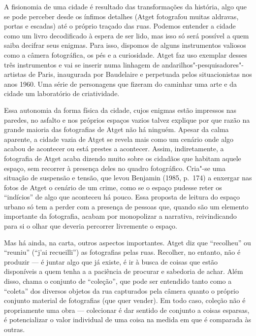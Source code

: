A fisionomia de uma cidade é resultado das transformações da história,
algo que se pode perceber desde os ínfimos detalhes (Atget fotografou
muitas aldravas, portas e escadas) até o próprio traçado das ruas.
Podemos entender a cidade como um livro decodificado à espera de ser
lido, mas isso só será possível a quem saiba decifrar seus enigmas. Para
isso, dispomos de alguns instrumentos valiosos como a câmera
fotográfica, os pés e a curiosidade. Atget faz uso exemplar desses três
instrumentos e vai se inserir numa linhagem de
andarilhos"-pesquisadores"-artistas de Paris, inaugurada por Baudelaire e
perpetuada pelos situacionistas nos anos 1960. Uma série de personagens
que fizeram do caminhar uma arte e da cidade um laboratório de
criatividade.

Essa autonomia da forma física da cidade, cujos enigmas estão impressos
nas paredes, no asfalto e nos próprios espaços vazios talvez explique
por que razão na grande maioria das fotografias de Atget não há ninguém. Apesar
da calma aparente, a cidade vazia de Atget se revela mais como um
cenário onde algo acabou de acontecer ou está prestes a acontecer.
Assim, indiretamente, a fotografia de Atget acaba dizendo muito sobre os
cidadãos que habitam aquele espaço, sem recorrer à presença deles no
quadro fotográfico. Cria"-se uma situação de suspensão e tensão, que
levou Benjamin (1985, p.~174) a enxergar nas fotos de Atget o cenário de
um crime, como se o espaço pudesse reter os ``indícios'' de algo que
aconteceu há pouco. Essa proposta de leitura do espaço urbano só tem a
perder com a presença de pessoas que, quando são um elemento importante
da fotografia, acabam por monopolizar a narrativa, reivindicando para si
o olhar que deveria percorrer livremente o espaço.

Mas há ainda, na carta, outros aspectos importantes. Atget diz que
``recolheu'' ou ``reuniu'' (``j'ai recueilli'') as fotografias pelas
ruas. Recolher, no entanto, não é produzir --- é juntar algo que já
existe, é ir à busca de coisas que estão disponíveis a quem tenha a a
paciência de procurar e sabedoria de achar. Além disso, chama o conjunto
de ``coleção'', que pode ser entendido tanto como a ``coleta'' dos
diversos objetos da rua capturados pela câmera quanto o próprio conjunto
material de fotografias (que quer vender). Em todo caso, coleção não é
propriamente uma obra --- colecionar é dar sentido de conjunto a coisas
esparsas, é potencializar o valor individual de uma coisa na medida em
que é comparada às outras.

